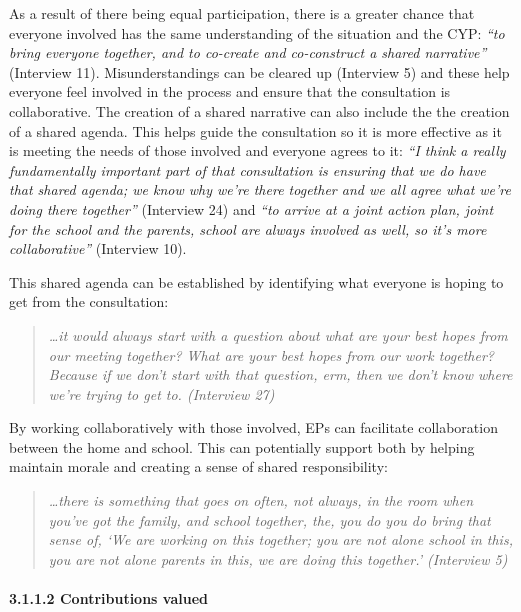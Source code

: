 \documentclass[
  english,
  man]{apa7}
\let\oldparagraph\paragraph
\renewcommand{\paragraph}[1]{\oldparagraph{#1}\mbox{}}
\begin{document}
As a result of there being equal participation, there is a greater chance that everyone involved has the same understanding of the situation and the CYP: \emph{``to bring everyone together, and to co-create and co-construct a shared narrative''} (Interview 11). Misunderstandings can be cleared up (Interview 5) and these help everyone feel involved in the process and ensure that the consultation is collaborative. The creation of a shared narrative can also include the the creation of a shared agenda. This helps guide the consultation so it is more effective as it is meeting the needs of those involved and everyone agrees to it: \emph{``I think a really fundamentally important part of that consultation is ensuring that we do have that shared agenda; we know why we're there together and we all agree what we're doing there together''} (Interview 24) and \emph{``to arrive at a joint action plan, joint for the school and the parents, school are always involved as well, so it's more collaborative''} (Interview 10).

This shared agenda can be established by identifying what everyone is hoping to get from the consultation:

\begin{quote}
\emph{\ldots it would always start with a question about what are your best hopes
from our meeting together? What are your best hopes from our work
together? Because if we don't start with that question, erm, then we
don't know where we're trying to get to. (Interview 27)}
\end{quote}

By working collaboratively with those involved, EPs can facilitate collaboration between the home and school. This can potentially support both by helping maintain morale and creating a sense of shared responsibility:

\begin{quote}
\emph{\ldots there is something that goes on often, not always, in the room when
you've got the family, and school together, the, you do you do bring
that sense of, `We are working on this together; you are not alone
school in this, you are not alone parents in this, we are doing this
together.' (Interview 5)}
\end{quote}

\hypertarget{contributions-valued}{%
\paragraph{3.1.1.2 Contributions valued}\label{contributions-valued}}
\end{document}
